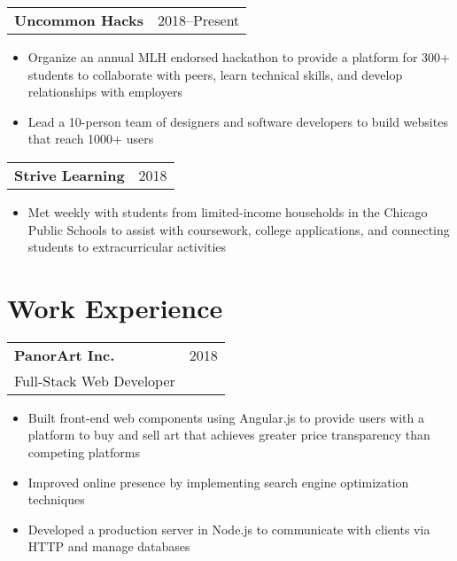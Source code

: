 \documentclass[letterpaper, 11pt]{article}
\begin{document}
\begin{tabular}{@{} L{12cm} @{} R{4.51cm} @{}}
  \textbf{Uncommon Hacks} & 2018--Present\\
\end{tabular}
\begin{itemize}
\item Organize an annual MLH endorsed hackathon to provide a platform for 300+
  students to collaborate with peers, learn technical skills,
  and develop relationships with employers
\item Lead a 10-person team of designers and software developers
  to build websites that reach 1000+ users
\end{itemize}

\begin{tabular}{@{} L{12cm} @{} R{4.51cm} @{}}
  \textbf{Strive Learning} & 2018\\
\end{tabular}
\begin{itemize}
\item Met weekly with students from limited-income households in the Chicago Public Schools
  to assist with coursework, college applications, and connecting
  students to extracurricular activities
\end{itemize}

\section{Work Experience}
\begin{tabular}{@{} L{12cm} @{} R{4.51cm} @{}}
  \textbf{PanorArt Inc.} & 2018 \\
  Full-Stack Web Developer\\
\end{tabular}
\begin{itemize}
  \item Built front-end web components using Angular.js to provide users with a platform to buy and sell art that achieves greater price transparency than competing platforms
  \item Improved online presence by implementing search engine optimization techniques
  \item Developed a production server in Node.js to communicate with clients via HTTP and manage databases
\end{itemize}
\end{document}
